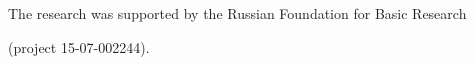 


\vspace*{-10pt}



\Ack



\vspace*{-4pt}



\noindent

The research was supported by the Russian Foundation for Basic Research 

(project 15-07-002244).



\renewcommand{\bibname}{\protect\rmfamily References}




